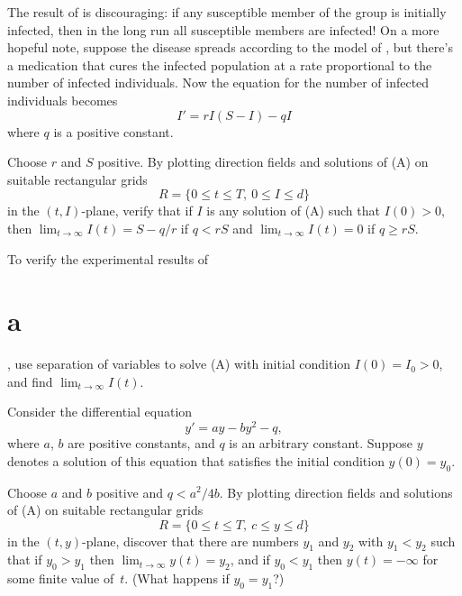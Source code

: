 \begin{exerciselist}
\item\label{exer:2.2.30}\Lex
The result of  is discouraging: if any
susceptible member of the group is
initially infected, then in the long run all susceptible members are
infected!
 On a more hopeful note, suppose   the disease spreads
according to the model of , but there's a
medication that cures the infected population at a rate proportional
to the number of infected individuals. Now the equation for the number
of infected individuals becomes
\[
I'=rI(S-I)-qI\tag{A}
\]
where $q$ is a positive constant.
\begin{alist}
\item %
Choose  $r$ and $S$ positive.
By plotting  direction fields and solutions of (A) on
suitable rectangular grids
\[
R=\{0\le t \le T,\ 0\le I \le d\}
\]
in the $(t,I)$-plane, verify that if $I$ is any solution of
(A) such that $I(0)>0$, then $\lim_{t\to\infty}I(t)=S-q/r$
if $q<rS$ and $\lim_{t\to\infty}I(t)=0$ if $q\ge rS$.
\item %
To verify the experimental results of \part{a}, use separation of
variables to solve (A) with initial condition $I(0)=I_0>0$, and find
$\lim_{t\to\infty}I(t)$. 
\end{alist}

\item\label{exer:2.2.31}\Lex
Consider the differential equation
\[
y'=ay-by^2-q,\tag{A}
\]
where $a$, $b$ are positive constants, and $q$ is an arbitrary
constant. Suppose  $y$ denotes a solution of this equation
that satisfies the initial condition $y(0)=y_0$.

\begin{alist}
\item %
Choose  $a$ and $b$ positive and  $q<a^2/4b$.
By plotting  direction fields and solutions of (A) on
suitable rectangular grids
\[
R=\{0\le t \le T,\ c\le y \le d\}\tag{B}
\]
in the $(t,y)$-plane,  discover that there are numbers $y_1$ and
$y_2$ with $y_1<y_2$ such that if $y_0>y_1$ then
$\lim_{t\to\infty}y(t)=y_2$, and if $y_0<y_1$ then $y(t)=-\infty$
for some finite value of~$t$. (What happens if $y_0=y_1$?)


\end{alist}
\end{exerciselist}
